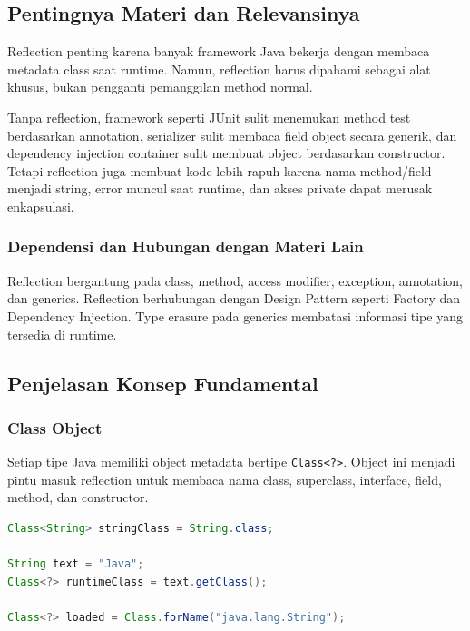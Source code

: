\subsection{Pentingnya Materi dan Relevansinya}

\begin{jawab}
Reflection penting karena banyak framework Java bekerja dengan membaca metadata class saat runtime. Namun, reflection harus dipahami sebagai alat khusus, bukan pengganti pemanggilan method normal.
\end{jawab}

Tanpa reflection, framework seperti JUnit sulit menemukan method test berdasarkan annotation, serializer sulit membaca field object secara generik, dan dependency injection container sulit membuat object berdasarkan constructor. Tetapi reflection juga membuat kode lebih rapuh karena nama method/field menjadi string, error muncul saat runtime, dan akses private dapat merusak enkapsulasi.

\subsubsection{Dependensi dan Hubungan dengan Materi Lain}

Reflection bergantung pada class, method, access modifier, exception, annotation, dan generics. Reflection berhubungan dengan Design Pattern seperti Factory dan Dependency Injection. Type erasure pada generics membatasi informasi tipe yang tersedia di runtime.

\subsection{Penjelasan Konsep Fundamental}

\subsubsection{Class Object}

\begin{jawab}
Setiap tipe Java memiliki object metadata bertipe \texttt{Class<?>}. Object ini menjadi pintu masuk reflection untuk membaca nama class, superclass, interface, field, method, dan constructor.
\end{jawab}

\begin{lstlisting}[language=Java, caption={Mendapatkan Class object}, label={lst:class-object}]
Class<String> stringClass = String.class;

String text = "Java";
Class<?> runtimeClass = text.getClass();

Class<?> loaded = Class.forName("java.lang.String");
\end{lstlisting}


